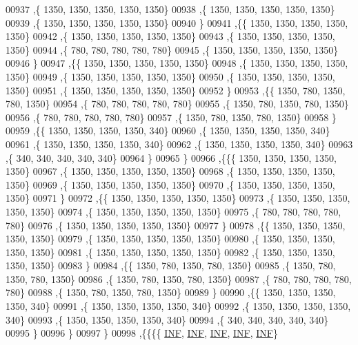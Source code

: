 \begin{DoxyCode}
00937    ,\{  1350,  1350,  1350,  1350,  1350\}
00938    ,\{  1350,  1350,  1350,  1350,  1350\}
00939    ,\{  1350,  1350,  1350,  1350,  1350\}
00940    \}
00941   ,\{\{  1350,  1350,  1350,  1350,  1350\}
00942    ,\{  1350,  1350,  1350,  1350,  1350\}
00943    ,\{  1350,  1350,  1350,  1350,  1350\}
00944    ,\{   780,   780,   780,   780,   780\}
00945    ,\{  1350,  1350,  1350,  1350,  1350\}
00946    \}
00947   ,\{\{  1350,  1350,  1350,  1350,  1350\}
00948    ,\{  1350,  1350,  1350,  1350,  1350\}
00949    ,\{  1350,  1350,  1350,  1350,  1350\}
00950    ,\{  1350,  1350,  1350,  1350,  1350\}
00951    ,\{  1350,  1350,  1350,  1350,  1350\}
00952    \}
00953   ,\{\{  1350,   780,  1350,   780,  1350\}
00954    ,\{   780,   780,   780,   780,   780\}
00955    ,\{  1350,   780,  1350,   780,  1350\}
00956    ,\{   780,   780,   780,   780,   780\}
00957    ,\{  1350,   780,  1350,   780,  1350\}
00958    \}
00959   ,\{\{  1350,  1350,  1350,  1350,   340\}
00960    ,\{  1350,  1350,  1350,  1350,   340\}
00961    ,\{  1350,  1350,  1350,  1350,   340\}
00962    ,\{  1350,  1350,  1350,  1350,   340\}
00963    ,\{   340,   340,   340,   340,   340\}
00964    \}
00965   \}
00966  ,\{\{\{  1350,  1350,  1350,  1350,  1350\}
00967    ,\{  1350,  1350,  1350,  1350,  1350\}
00968    ,\{  1350,  1350,  1350,  1350,  1350\}
00969    ,\{  1350,  1350,  1350,  1350,  1350\}
00970    ,\{  1350,  1350,  1350,  1350,  1350\}
00971    \}
00972   ,\{\{  1350,  1350,  1350,  1350,  1350\}
00973    ,\{  1350,  1350,  1350,  1350,  1350\}
00974    ,\{  1350,  1350,  1350,  1350,  1350\}
00975    ,\{   780,   780,   780,   780,   780\}
00976    ,\{  1350,  1350,  1350,  1350,  1350\}
00977    \}
00978   ,\{\{  1350,  1350,  1350,  1350,  1350\}
00979    ,\{  1350,  1350,  1350,  1350,  1350\}
00980    ,\{  1350,  1350,  1350,  1350,  1350\}
00981    ,\{  1350,  1350,  1350,  1350,  1350\}
00982    ,\{  1350,  1350,  1350,  1350,  1350\}
00983    \}
00984   ,\{\{  1350,   780,  1350,   780,  1350\}
00985    ,\{  1350,   780,  1350,   780,  1350\}
00986    ,\{  1350,   780,  1350,   780,  1350\}
00987    ,\{   780,   780,   780,   780,   780\}
00988    ,\{  1350,   780,  1350,   780,  1350\}
00989    \}
00990   ,\{\{  1350,  1350,  1350,  1350,   340\}
00991    ,\{  1350,  1350,  1350,  1350,   340\}
00992    ,\{  1350,  1350,  1350,  1350,   340\}
00993    ,\{  1350,  1350,  1350,  1350,   340\}
00994    ,\{   340,   340,   340,   340,   340\}
00995    \}
00996   \}
00997  \}
00998 ,\{\{\{\{   \mbox{\hyperlink{energy__const_8h_a12c2040f25d8e3a7b9e1c2024c618cb6}{INF}},   \mbox{\hyperlink{energy__const_8h_a12c2040f25d8e3a7b9e1c2024c618cb6}{INF}},   \mbox{\hyperlink{energy__const_8h_a12c2040f25d8e3a7b9e1c2024c618cb6}{INF}},   \mbox{\hyperlink{energy__const_8h_a12c2040f25d8e3a7b9e1c2024c618cb6}{INF}},   \mbox{\hyperlink{energy__const_8h_a12c2040f25d8e3a7b9e1c2024c618cb6}{INF}}\}

\end{DoxyCode}
